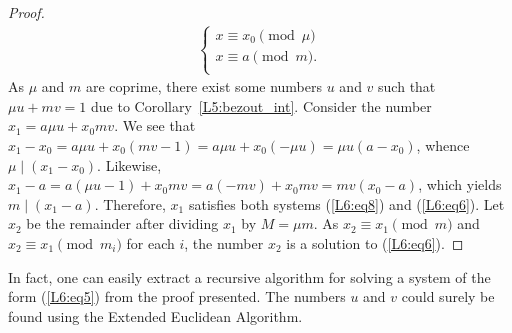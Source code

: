 \documentclass[12pt,notitlepage]{article}
\theoremstyle{plain}
\theoremstyle{definition}
\theoremstyle{plain}
\newcommand{\1}{\mathbf{1}}
\newcommand{\0}{\mathbf{0}}
\newcommand{\dvd}{\mathop{\mid}}
\begin{document}
\begin{proof}
	\begin{equation}\label{L6:eq8}
		\begin{array}{l}
			\begin{cases}
				x \equiv x_0 \pmod {\mu}\\
				x \equiv a \pmod {m}.\\
			\end{cases}
		\end{array}
	\end{equation}
	As $\mu$ and $m$ are coprime, there exist some numbers $u$ and $v$ such that $\mu u + m v = 1$ due to Corollary~\ref{L5:bezout_int}. Consider the number $x_1 = a \mu u + x_0 m v$. We see that $x_1 - x_0 = a \mu u + x_0 (mv - 1) = a \mu u + x_0 (- \mu u) = \mu u (a - x_0)$, whence $\mu \dvd (x_1 - x_0)$. Likewise, $x_1 - a= a (\mu u - 1)  + x_0mv = a (- m v) + x_0mv = m v (x_0 - a)$, which yields $m \dvd (x_1 - a)$. Therefore, $x_1$ satisfies both systems (\ref{L6:eq8}) and (\ref{L6:eq6}). Let $x_2$ be the remainder after dividing $x_1$ by $M = \mu m$. As $x_2 \equiv x_1 \pmod m$ and $x_2 \equiv x_1 \pmod {m_i}$ for each $i$, the number $x_2$ is a solution to (\ref{L6:eq6}).
\end{proof}

In fact, one can easily extract a recursive algorithm for solving a system of the form (\ref{L6:eq5}) from the proof presented. The numbers $u$ and $v$ could surely be found using the Extended Euclidean Algorithm.
\end{document}

